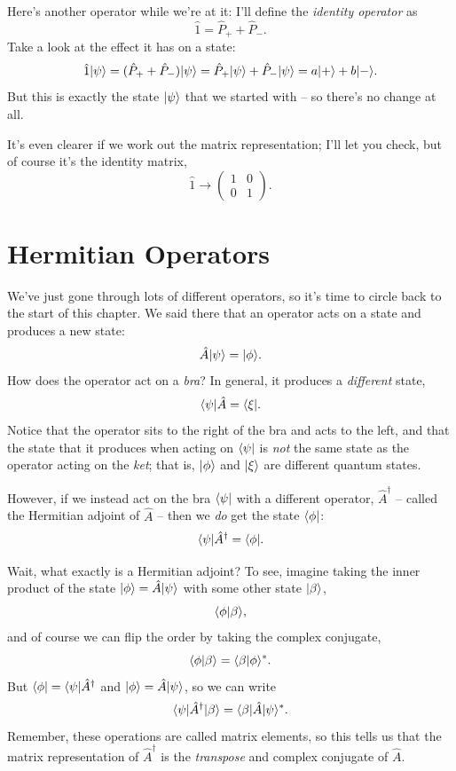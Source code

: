 Here's another operator while we're at it:  I'll define the \emph{identity operator} as 
\begin{equation}
\hat{1} = \hat{P}_+ + \hat{P}_-.
\end{equation}
Take a look at the effect it has on a state:
\[
\hat{1} | \psi \rangle = (\hat{P}_+ + \hat{P}_-) | \psi \rangle = \hat{P}_+| \psi \rangle + \hat{P}_-| \psi \rangle = a| + \rangle + b| - \rangle.
\]
But this is exactly the state $| \psi \rangle$ that we started with -- so there's no change at all.

It's even clearer if we work out the matrix representation; I'll let you check, but of course it's the identity matrix,
\begin{equation}
\hat{1} \to \begin{pmatrix} 1 & 0 \\ 0 & 1 \end{pmatrix}.
\end{equation}

\section{Hermitian Operators}
\label{sec_hermitian_operators}

We've just gone through lots of different operators, so it's time to circle back to the start of this chapter.  We said there that an operator acts on a state and produces a new state:
\[
\hat{A} | \psi \rangle = | \phi \rangle.
\]
How does the operator act on a \emph{bra}?  In general, it produces a \emph{different} state,
\begin{equation}
\langle \psi | \hat{A} = \langle \xi |.
\end{equation}
Notice that the operator sits to the right of the bra and acts to the left, and that the state that it produces when acting on $\langle \psi |$ is \emph{not} the same state as the operator acting on the \emph{ket}; that is, $| \phi \rangle$ and $| \xi \rangle$ are different quantum states.

However, if we instead act on the bra $\langle \psi |$ with a different operator, $\hat{A}^\dagger$ -- called the Hermitian adjoint of $\hat{A}$ -- then we \emph{do} get the state $\langle \phi |$:
\begin{equation}
\langle \psi | \hat{A}^\dagger = \langle \phi |.
\end{equation}

Wait, what exactly is a Hermitian adjoint?  To see, imagine taking the inner product of the state $| \phi \rangle = \hat{A} | \psi \rangle$ with some other state $| \beta \rangle$,
\[
\langle \phi | \beta \rangle,
\]
and of course we can flip the order by taking the complex conjugate,
\[
\langle \phi | \beta \rangle = \langle \beta | \phi \rangle^*.
\]
But $\langle \phi | = \langle \psi |\hat{A}^\dagger$ and $| \phi \rangle = \hat{A} | \psi \rangle$, so we can write
\[
\langle \psi |\hat{A}^\dagger | \beta \rangle = \langle \beta | \hat{A} | \psi \rangle^*.
\]
Remember, these operations are called matrix elements, so this tells us that the matrix representation of $\hat{A}^\dagger$ is the \emph{transpose} and complex conjugate of $\hat{A}$.


